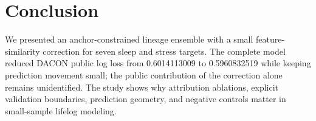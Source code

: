 \documentclass[conference]{IEEEtran}
\begin{document}
\section{Conclusion}
We presented an anchor-constrained lineage ensemble with a small feature-similarity correction for seven sleep and stress targets. The complete model reduced DACON public log loss from 0.6014113009 to 0.5960832519 while keeping prediction movement small; the public contribution of the correction alone remains unidentified. The study shows why attribution ablations, explicit validation boundaries, prediction geometry, and negative controls matter in small-sample lifelog modeling.



\end{document}
